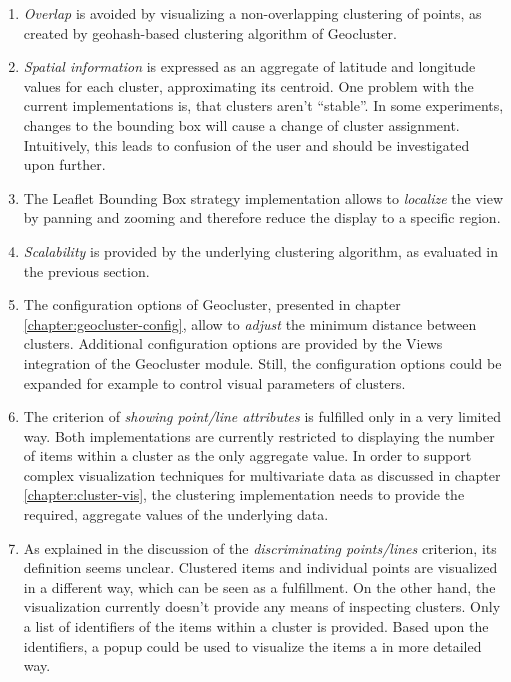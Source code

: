 \begin{enumerate}

\item \textit{Overlap} is avoided by visualizing a non-overlapping clustering of points, as created by geohash-based clustering algorithm of Geocluster.

\item \textit{Spatial information} is expressed as an aggregate of latitude and longitude values for each cluster, approximating its centroid. One problem with the current implementations is, that clusters aren't ``stable''. In some experiments, changes to the bounding box will cause a change of cluster assignment. Intuitively, this leads to confusion of the user and should be investigated upon further. 

\item The Leaflet Bounding Box strategy implementation allows to \textit{localize} the view by panning and zooming and therefore reduce the display to a specific region.

\item \textit{Scalability} is provided by the underlying clustering algorithm, as evaluated in the previous section.

\item The configuration options of Geocluster, presented in chapter \ref{chapter:geocluster-config}, allow to \textit{adjust} the minimum distance between clusters. Additional configuration options are provided by the Views integration of the Geocluster module. Still, the configuration options could be expanded for example to control visual parameters of clusters. 

\item The criterion of \textit{showing point/line attributes} is fulfilled only in a very limited way. Both implementations are currently restricted to displaying the number of items within a cluster as the only aggregate value. In order to support complex visualization techniques for multivariate data as discussed in chapter \ref{chapter:cluster-vis}, the clustering implementation needs to provide the required, aggregate values of the underlying data.

\item As explained in the discussion of the \textit{discriminating points/lines} criterion, its definition seems unclear. Clustered items and individual points are visualized in a different way, which can be seen as a fulfillment. On the other hand, the visualization currently doesn't provide any means of inspecting clusters. Only a list of identifiers of the items within a cluster is provided. Based upon the identifiers, a popup could be used to visualize the items a in more detailed way.


\end{enumerate}
